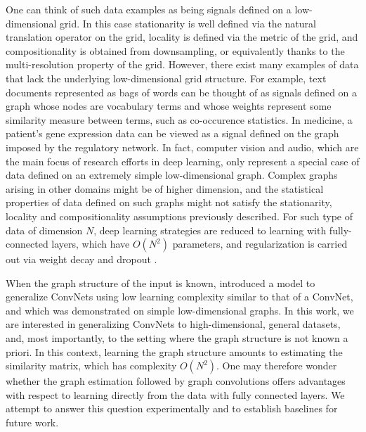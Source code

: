 \documentclass{article} %
\begin{document}
%
%
% 
One can think of such data examples as being signals defined on a low-dimensional grid. In this case stationarity is well defined via the natural translation 
operator on the grid, locality is defined via the metric of the grid, and compositionality is obtained from downsampling, or equivalently thanks to the multi-resolution property of the grid.
However, there exist many examples of data that lack the underlying low-dimensional grid structure. 
For example, text documents represented as bags of words can be thought of as signals defined on a graph whose nodes are vocabulary terms and whose weights represent some similarity measure between terms, such as co-occurence statistics. In medicine, a patient's gene expression data can be viewed as a signal defined on the graph imposed by the regulatory network. In fact, computer vision and audio, which are the main focus of research efforts in deep learning, only represent a special case of data defined on an extremely simple low-dimensional graph. Complex graphs arising in other domains might be of higher dimension, and the statistical properties of data defined on such graphs might not satisfy the stationarity, locality and compositionality assumptions previously described.
For such type of data of dimension $N$, deep learning strategies are reduced to learning with fully-connected layers, which have $O(N^2)$ parameters, and regularization is carried out via weight decay and dropout \cite{srivastava2014dropout}.

When the graph structure of the input is known, \cite{spectralnet2013} introduced a model to generalize ConvNets using low learning complexity similar to that of a ConvNet, and which was demonstrated on simple low-dimensional graphs. In this work, we are interested in generalizing ConvNets to high-dimensional, general datasets,  and, most importantly, to the setting where the graph structure is not known a priori. In this context, learning the graph structure amounts to estimating the similarity matrix, which has complexity $O(N^2)$. One may therefore wonder whether the graph estimation followed by graph convolutions offers advantages with respect to learning directly from the data with fully connected layers. We attempt to answer this question experimentally and to establish baselines for future work. 
 
\end{document}
